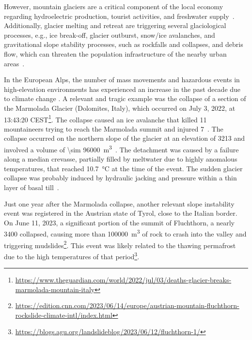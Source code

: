 However, mountain glaciers are a critical component of the local economy regarding hydroelectric production, tourist activities, and freshwater supply~\citep{Barnett2005, hock2005}. 
Additionally, glacier melting and retreat are triggering several glaciological processes, e.g., ice break-off, glacier outburst, snow/ice avalanches, and gravitational slope stability processes, such as rockfalls and collapses, and debris flow, which can threaten the population infrastructure of the nearby urban areas~\citep{Kaab2004, Deline2015, Giordan2020a}.

In the European Alps, the number of mass movements and hazardous events in high-elevation environments has experienced an increase in the past decade due to climate change \citep{chiarle2023, Nigrelli2024}.
A relevant and tragic example was the collapse of a section of the Marmolada Glacier (Dolomites, Italy), which occurred on July 3, 2022, at 13:43:20 CEST\footnote{\url{https://www.theguardian.com/world/2022/jul/03/deaths-glacier-breaks-marmolada-mountain-italy}}. 
The collapse caused an ice avalanche that killed 11 mountaineers trying to reach the Marmolada summit and injured 7~\citep{Olivieri2023, Bondesan2023}.
The collapse occurred on the northern slope of the glacier at an elevation of \SI{3213}{\masl} and involved a volume of \SI{\sim 96000}{\cubic\meter}~\citep{Olivieri2023}.
The detachment was caused by a failure along a median crevasse, partially filled by meltwater due to highly anomalous temperatures, that reached \SI{10.7}{\celsius} at the time of the event.
The sudden glacier collapse was probably induced by hydraulic jacking and pressure within a thin layer of basal till~\citep{Bondesan2023}.

Just one year after the Marmolada collapse, another relevant slope instability event was registered in the Austrian state of Tyrol, close to the Italian border. 
On June 11, 2023, a significant portion of the summit of Fluchthorn, a nearly \SI{3400}{\masl} collapsed, causing more than \SI{100000}{\cubic\meter} of rock to crash into the valley and triggering mudslides\footnote{\mbox{\url{https://edition.cnn.com/2023/06/14/europe/austrian-mountain-fluchthorn-rockslide-climate-intl/index.html}}}.
This event was likely related to the thawing permafrost due to the high temperatures of that period\footnote{\url{https://blogs.agu.org/landslideblog/2023/06/12/fluchthorn-1/}}.

